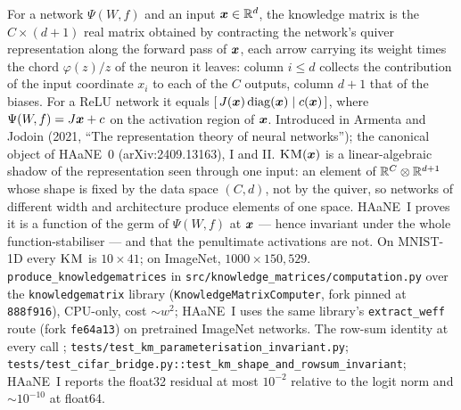 {For a network $\Psi(W\!,f)$ and an input $\boldsymbol{x}\in\mathbb{R}^d$, the knowledge matrix is the $C\times(d+1)$ real matrix obtained by contracting the network's quiver representation along the forward pass of $\boldsymbol{x}$, each arrow carrying its weight times the chord $\varphi(z)/z$ of the neuron it leaves: column $i\le d$ collects the contribution of the input coordinate $x_i$ to each of the $C$ outputs, column $d+1$ that of the biases. For a ReLU network it equals $[\,J(\boldsymbol{x})\,\mathrm{diag}(\boldsymbol{x})\mid c(\boldsymbol{x})\,]$, where $\Psi(W\!,f)=J\boldsymbol{x}+c$ on the activation region of $\boldsymbol{x}$. Introduced in Armenta and Jodoin (2021, ``The representation theory of neural networks''); the canonical object of HAaNE~0 (arXiv:2409.13163), I and II.}
{$\textsc{KM}(\boldsymbol{x})$ is a linear-algebraic shadow of the representation seen through one input: an element of $\mathbb{R}^C\otimes\mathbb{R}^{d+1}$ whose shape is fixed by the data space $(C,d)$, not by the quiver, so networks of different width and architecture produce elements of one space. HAaNE~I proves it is a function of the germ of $\Psi(W\!,f)$ at $\boldsymbol{x}$ --- hence invariant under the whole function-stabiliser --- and that the penultimate activations are not. On MNIST-1D every $\textsc{KM}$ is $10\times41$; on ImageNet, $1000\times150{,}529$.}
{\texttt{produce\_knowledgematrices} in \texttt{src/knowledge\_matrices/computation.py} over the \texttt{knowledgematrix} library (\texttt{KnowledgeMatrixComputer}, fork pinned at \texttt{888f916}), CPU-only, cost $\sim w^2$; HAaNE~I uses the same library's \texttt{extract\_weff} route (fork \texttt{fe64a13}) on pretrained ImageNet networks.}
{The row-sum identity at every call ; \texttt{tests/test\_km\_parameterisation\_invariant.py}; \texttt{tests/test\_cifar\_bridge.py::test\_km\_shape\_and\_rowsum\_invariant}; HAaNE~I reports the float32 residual at most $10^{-2}$ relative to the logit norm and $\sim10^{-10}$ at float64.}

